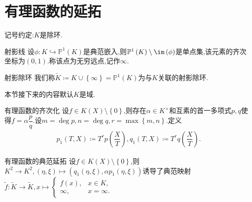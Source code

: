 \section{有理函数的延拓}

记号约定:$K$是除环.

\begin{definition}{射影线}{}
	设$\phi:K\hookrightarrow\mathbb{P}^{1}\left(K\right)$是典范嵌入,则$\mathbb{P}^{1}\left(K\right)\setminus\im\left(\phi\right)$是单点集,该元素的齐次坐标为$\left(0,1\right)$.称该点为无穷远点,记作$\infty$.
\end{definition}

\begin{definition}{射影除环}{}
	我们称$\tilde{K}\coloneq K\cup\left\{\infty\right\}=\mathbb{P}^{1}\left(K\right)$为与$K$关联的射影除环.
\end{definition}

本节接下来的内容默认$K$是域.

\begin{definition}{有理函数的齐次化}{}
	设$f\in K\left(X\right)\setminus\left\{0\right\}$,则存在$\alpha\in K^{\times}$和互素的首一多项式$p,q$使得$f=\alpha\dfrac{p}{q}$.设$m=\deg p,n=\deg q,r=\max\left\{m,n\right\}$.定义
	\begin{align*}
		p_{1}\left(T,X\right)\coloneq T^{r}p\left(\dfrac{X}{T}\right),q_{1}\left(T,X\right)\coloneq T^{r}q\left(\dfrac{X}{T}\right).
	\end{align*}
\end{definition}

\begin{theorem}{有理函数的典范延拓}{}
	设$f\in K\left(X\right)\setminus\left\{0\right\}$,则$K^{2}\to K^{2},\left(\eta,\xi\right)\mapsto\left(q_{1}\left(\eta,\xi\right),\alpha p_{1}\left(\eta,\xi\right)\right)$诱导了典范映射$\tilde{f}:\tilde{K}\to\tilde{K},x\mapsto
	\begin{cases}
		f\left(x\right),&x\in K,\\
		\infty,&x=\infty.
	\end{cases}$
\end{theorem}

